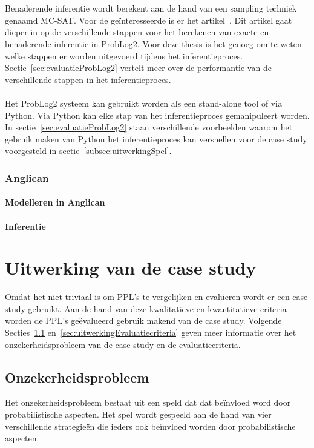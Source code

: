 \documentclass[12pt,a4paper,oneside]{book}
\theoremstyle{definition}
\begin{document}
\\\\
Benaderende inferentie wordt berekent aan de hand van een sampling techniek genaamd MC-SAT. Voor de ge\"{i}nteresseerde is er het artikel~\cite{plpinferencelearningwbf}. Dit artikel gaat dieper in op de verschillende stappen voor het berekenen van exacte en benaderende inferentie in ProbLog2. Voor deze thesis is het genoeg om te weten welke stappen er worden uitgevoerd tijdens het inferentieproces. Sectie~\ref{sec:evaluatieProbLog2} vertelt meer over de performantie van de verschillende stappen in het inferentieproces.
\\\\
Het ProbLog2 systeem kan gebruikt worden als een stand-alone tool of via Python. Via Python kan elke stap van het inferentieproces gemanipuleert worden. In sectie~\ref{sec:evaluatieProbLog2} staan verschillende voorbeelden waarom het gebruik maken van Python het inferentieproces kan versnellen voor de case study voorgesteld in sectie~\ref{subsec:uitwerkingSpel}.
\subsection{Anglican}
\label{subsec:Anglican}
\subsubsection{Modelleren in Anglican}
\label{subsubsec:ModellerenInAnglican}
\subsubsection{Inferentie}
\label{subsubsec:InferentieAnglican}


\chapter{Uitwerking van de case study}
Omdat het niet triviaal is om PPL's te vergelijken en evalueren wordt er een case study gebruikt. Aan de hand van deze kwalitatieve en kwantitatieve criteria worden de PPL's ge\"{e}valueerd gebruik makend van de case study. Volgende Secties~\ref{sec:uitwerkingProblem} en~\ref{sec:uitwerkingEvaluatiecriteria} geven meer informatie over het onzekerheidsprobleem van de case study en de evaluatiecriteria.
\section{Onzekerheidsprobleem}
\label{sec:uitwerkingProblem}
Het onzekerheidsprobleem bestaat uit een speld dat dat be\"{i}nvloed word door probabilistische aspecten. Het spel wordt gespeeld aan de hand van vier verschillende strategie\"{e}n die ieders ook be\"{i}nvloed worden door probabilistische aspecten.
\end{document}
